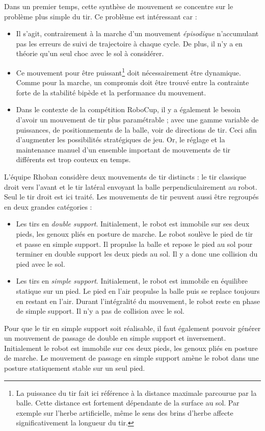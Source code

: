 Dans un premier temps, cette synthèse de mouvement se concentre 
sur le problème plus simple du tir. Ce problème est intéressant car : 
\begin{itemize}
    \item Il s'agit, contrairement à la marche d'un mouvement \textit{épisodique}
        n'accumulant pas les erreurs de suivi de trajectoire à chaque cycle.
        De plus, il n'y a en théorie qu'un seul choc avec le sol à considérer.
    \item Ce mouvement pour être puissant\footnote{La puissance du tir fait ici référence
        à la distance maximale parcourue par la balle. 
        Cette distance est fortement dépendante de la surface au sol. 
        Par exemple sur l'herbe artificielle, même le sens des brins d'herbe 
        affecte significativement la longueur du tir.} 
        doit nécessairement être dynamique.
        Comme pour la marche, un compromis doit être trouvé entre 
        la contrainte forte de la stabilité bipède et la performance du mouvement.
    \item Dans le contexte de la compétition RoboCup, il y a également le besoin
        d'avoir un mouvement de tir plus paramétrable ; avec une gamme variable
        de puissances, de positionnements de la balle, voir de directions de tir.
        Ceci afin d'augmenter les possibilités stratégiques de jeu.
        Or, le réglage et la maintenance manuel d'un ensemble important 
        de mouvements de tir différents est trop couteux en temps.
\end{itemize}
L'équipe Rhoban considère deux mouvements de tir distincts : le tir
classique \og droit \fg vers l'avant et le tir \og latéral \fg
envoyant la balle perpendiculairement au robot.
Seul le tir droit est ici traité.
Les mouvements de tir peuvent aussi être regroupés en deux grandes
catégories :
\begin{itemize}
    \item Les tirs en \textit{double support}.
        Initialement, le robot est immobile sur ses deux pieds, 
        les genoux pliés en posture de marche.
        Le robot soulève le pied de tir et passe en simple support.
        Il propulse la balle et repose le pied au sol pour terminer 
        en double support les deux pieds au sol.
        Il y a donc une collision du pied avec le sol.
    \item Les tirs en \textit{simple support}.
        Initialement, le robot est immobile en équilibre statique sur un pied.
        Le pied en l'air propulse la balle puis se replace toujours 
        en restant en l'air. Durant l'intégralité du mouvement, 
        le robot reste en phase de simple support. 
        Il n'y a pas de collision avec le sol.
\end{itemize}
Pour que le tir en simple support soit réalisable, 
il faut également pouvoir générer un mouvement de passage de
double en simple support et inversement.
Initialement le robot est immobile sur ces deux pieds, 
les genoux pliés en posture de marche.
Le mouvement de passage en simple support amène le robot dans une posture
statiquement stable sur un seul pied.

